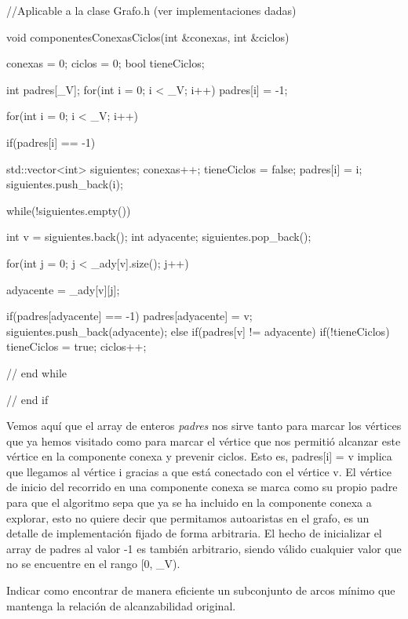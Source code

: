 \documentclass[12pt]{article}
\newenvironment{problem}[2][Problema]{\begin{trivlist}
\item[\hskip \labelsep {\bfseries #1}\hskip \labelsep {\bfseries #2.}]}{\end{trivlist}}
\begin{document}
\begin{listing}
//Aplicable a la clase Grafo.h (ver implementaciones dadas) 

 void componentesConexasCiclos(int &conexas, int &ciclos)
 {
    conexas = 0;
    ciclos = 0;
    bool tieneCiclos;
    
    int padres[_V]; 
    for(int i = 0; i < _V; i++) padres[i] = -1;
    
    for(int i = 0; i < _V; i++)
    {
        if(padres[i] == -1)
        {
        std::vector<int> siguientes;
        conexas++;
        tieneCiclos = false;
        padres[i] = i;
        siguientes.push_back(i);
        
        while(!siguientes.empty())
        {
            int v = siguientes.back();
            int adyacente;
            siguientes.pop_back();
                    
            for(int j = 0; j < _ady[v].size(); j++)
            {
                adyacente = _ady[v][j];
                
                if(padres[adyacente] == -1)
                {
                    padres[adyacente] = v;
                    siguientes.push_back(adyacente);
                }
                else if(padres[v] != adyacente)
                {
                    if(!tieneCiclos)
                    {
                        tieneCiclos = true;
                        ciclos++;
                    }
                }
            }
        } // end while
        } // end if
    }       
 }
\end{listing}

Vemos aquí que el array de enteros \textit{padres} nos sirve tanto para marcar los
vértices que ya hemos visitado como para marcar el vértice que nos permitió alcanzar
este vértice en la componente conexa y prevenir ciclos. Esto es, padres[i] = v implica
que llegamos al vértice i gracias a que está conectado con el vértice v. El vértice
de inicio del recorrido en una componente conexa se marca como su propio padre para
que el algoritmo sepa que ya se ha incluido en la componente conexa a explorar, esto
no quiere decir que permitamos autoaristas en el grafo, es un detalle de 
implementación fijado de forma arbitraria. El hecho de inicializar el array de padres
al valor -1 es también arbitrario, siendo válido cualquier valor que no se encuentre
en el rango [0, \_V).


\begin{problem}{4.13.2}
Indicar como encontrar de manera eficiente un subconjunto de arcos mínimo que mantenga
la relación de alcanzabilidad original.
\end{problem}
\end{document}
